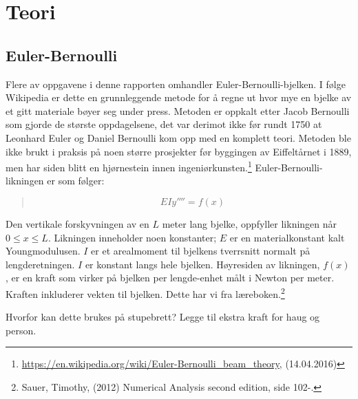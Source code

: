 \section{Teori}

\subsection{Euler-Bernoulli}
Flere av oppgavene i denne rapporten omhandler Euler-Bernoulli-bjelken. I følge Wikipedia er dette en grunnleggende metode for å regne ut hvor mye en bjelke av et gitt materiale bøyer seg under press. Metoden er oppkalt etter Jacob Bernoulli som gjorde de største oppdagelsene, det var derimot ikke før rundt 1750 at Leonhard Euler og Daniel Bernoulli kom opp med en komplett teori. Metoden ble ikke brukt i praksis på noen større prosjekter før byggingen av Eiffeltårnet i 1889, men har siden blitt en hjørnestein innen ingeniørkunsten.\footnote{\url{https://en.wikipedia.org/wiki/Euler-Bernoulli_beam_theory}, (14.04.2016)} Euler-Bernoulli-likningen er som følger:
\begin{quote}
\begin{equation}
EIy''''=f(x)
\end{equation}
\end{quote}
Den vertikale forskyvningen av en $L$ meter lang bjelke, oppfyller likningen når $0\leq x\leq L$. Likningen inneholder noen konstanter; $E$ er en materialkonstant kalt Youngmodulusen. $I$ er et arealmoment til bjelkens tverrsnitt normalt på lengderetningen. $I$ er konstant langs hele bjelken. Høyresiden av likningen, $f(x)$, er en kraft som virker på bjelken per lengde-enhet målt i Newton per meter. Kraften inkluderer vekten til bjelken. Dette har vi fra læreboken.\footnote{Sauer, Timothy, (2012) Numerical Analysis second edition, side 102-.}

Hvorfor kan dette brukes på stupebrett?
Legge til ekstra kraft for haug og person.

